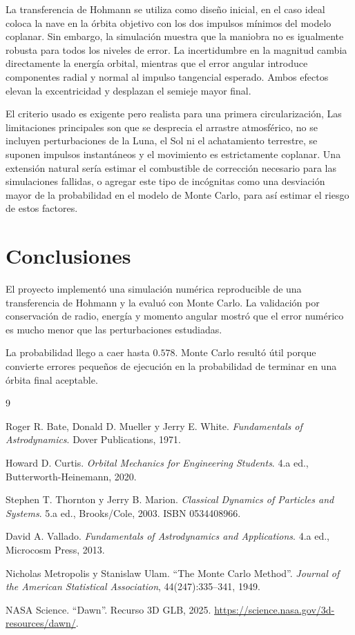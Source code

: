 \documentclass[12pt]{article}
\begin{document}
La transferencia de Hohmann se utiliza como diseño inicial, en el
caso ideal coloca la nave en la órbita objetivo con los dos impulsos mínimos
del modelo coplanar. Sin embargo, la simulación muestra que la maniobra no es
igualmente robusta para todos los niveles de error. La incertidumbre en la
magnitud cambia directamente la energía orbital, mientras que el error angular
introduce componentes radial y normal al impulso tangencial esperado. Ambos
efectos elevan la excentricidad y desplazan el semieje mayor final.

El criterio usado es exigente pero realista para una primera circularización,
Las limitaciones principales son que se desprecia el arrastre atmosférico, no se
incluyen perturbaciones de la Luna, el Sol ni el achatamiento terrestre, se
suponen impulsos instantáneos y el movimiento es estrictamente coplanar. Una
extensión natural sería estimar el combustible de corrección necesario para las
simulaciones fallidas, o agregar este tipo de incógnitas como una desviación mayor de la
probabilidad en el modelo de Monte Carlo, para así estimar el riesgo de estos factores.

\section{Conclusiones}

El proyecto implementó una simulación numérica reproducible de una transferencia
de Hohmann y la evaluó con Monte Carlo. La validación por
conservación de radio, energía y momento angular mostró que el error numérico es
mucho menor que las perturbaciones estudiadas.

La probabilidad llego a caer hasta $0.578$.
Monte Carlo resultó útil porque convierte errores pequeños de ejecución
en la probabilidad de terminar en una órbita final aceptable.

\begin{thebibliography}{9}

Roger R. Bate, Donald D. Mueller y Jerry E. White.
\textit{Fundamentals of Astrodynamics}. Dover Publications, 1971.

Howard D. Curtis.
\textit{Orbital Mechanics for Engineering Students}. 4.a ed.,
Butterworth-Heinemann, 2020.

Stephen T. Thornton y Jerry B. Marion.
\textit{Classical Dynamics of Particles and Systems}. 5.a ed.,
Brooks/Cole, 2003. ISBN 0534408966.

David A. Vallado.
\textit{Fundamentals of Astrodynamics and Applications}. 4.a ed.,
Microcosm Press, 2013.

Nicholas Metropolis y Stanislaw Ulam.
``The Monte Carlo Method''. \textit{Journal of the American Statistical
Association}, 44(247):335--341, 1949.

NASA Science.
``Dawn''. Recurso 3D GLB, 2025.
\url{https://science.nasa.gov/3d-resources/dawn/}.

\end{thebibliography}
\end{document}
